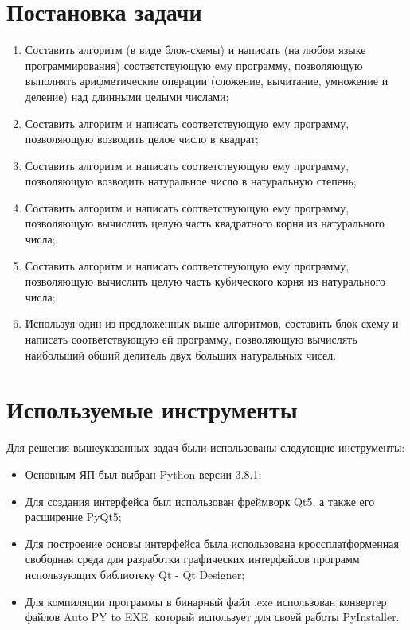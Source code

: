 \section{Постановка задачи}

\begin{enumerate}
    \item Составить алгоритм (в виде блок-схемы) и написать (на любом языке программирования) соответствующую ему программу,
    позволяющую выполнять арифметические операции (сложение, вычитание, умножение и деление) над длинными целыми числами;
    \item Составить алгоритм и написать соответствующую ему программу, позволяющую возводить целое число в квадрат;
    \item Составить алгоритм и написать соответствующую ему программу, позволяющую возводить натуральное число в натуральную степень;
    \item Составить алгоритм и написать соответствующую ему программу, позволяющую вычислить целую часть квадратного корня из натурального числа;
    \item Составить алгоритм и написать соответствующую ему программу, позволяющую вычислить целую часть кубического корня из натурального числа;
    \item Используя один из предложенных выше алгоритмов, составить блок схему и написать соответствующую ей программу,
    позволяющую вычислять наибольший общий делитель двух больших натуральных чисел.
\end{enumerate}


\clearpage
\section{Используемые инструменты}
Для решения вышеуказанных задач были использованы следующие инструменты:
\begin{itemize}
    \item Основным ЯП был выбран Python версии 3.8.1;
    \item Для создания интерфейса был использован фреймворк Qt5, а также его расширение PyQt5;
    \item Для построение основы интерфейса была использована кроссплатформенная свободная среда для разработки графических
    интерфейсов программ использующих библиотеку Qt - Qt Designer;
    \item Для компиляции программы в бинарный файл .exe использован конвертер файлов Auto PY to EXE, который использует для своей работы PyInstaller.
\end{itemize}


